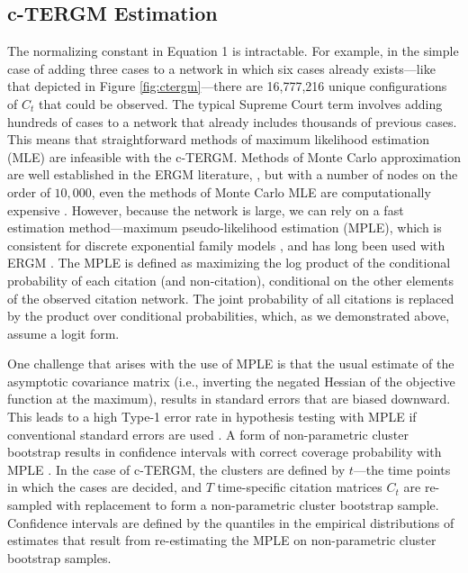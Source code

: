 \documentclass[headsepline=true, abstracton]{scrartcl}
\begin{document}
\subsection{c-TERGM Estimation}

The normalizing constant in Equation 1 is intractable. For example, in the simple case of adding three cases to a network in which six cases already exists---like that depicted in Figure \ref{fig:ctergm}---there are 16,777,216 unique configurations of $C_t$ that could be observed. The typical Supreme Court term involves adding hundreds of cases to a network that already includes thousands of previous cases. This means that straightforward methods of maximum likelihood estimation (MLE) are infeasible with the c-TERGM. Methods of Monte Carlo approximation are well established in the ERGM literature, \citep{hunter2006inference,van2009framework,hummel2012improving}, but with a number of nodes on the order of $10,000$, even the methods of Monte Carlo MLE are computationally expensive \citep{schmid2017exponential}. However, because the network is large, we can rely on a fast estimation method---maximum pseudo-likelihood estimation (MPLE), which is consistent for discrete exponential family models \citep{nguyen2017near}, and has long been used with ERGM \citep{strauss1990pseudolikelihood}. The MPLE is defined as maximizing the log product of the conditional probability of each citation (and non-citation), conditional on the other elements of the observed citation network. The joint probability of all citations is replaced by the product over conditional probabilities, which, as we demonstrated above, assume a logit form. 

One challenge that arises with the use of MPLE is that the usual estimate of the asymptotic covariance matrix (i.e., inverting the negated Hessian of the objective function at the maximum), results in standard errors that are biased downward. This leads to a high Type-1 error rate in hypothesis testing with MPLE if conventional standard errors are used \citep{van2009framework}. A form of non-parametric cluster bootstrap results in confidence intervals with correct coverage probability with MPLE \citep{desmarais2012statistical,desmarais2010consistent}. In the case of c-TERGM, the clusters are defined by $t$---the time points in which the cases are decided, and $T$ time-specific citation matrices $C_{t}$ are re-sampled with replacement to form a non-parametric cluster bootstrap sample. Confidence intervals are defined by the quantiles in the empirical distributions of estimates that result from re-estimating the MPLE on non-parametric cluster bootstrap samples. 
\end{document}
